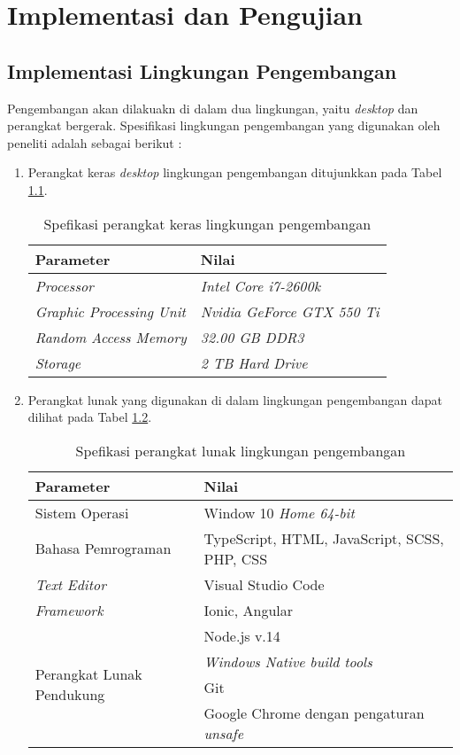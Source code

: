 \chapter{Implementasi dan Pengujian}

\section{Implementasi Lingkungan Pengembangan}
Pengembangan akan dilakuakn di dalam dua lingkungan, yaitu \textit{desktop} dan perangkat bergerak. Spesifikasi lingkungan pengembangan yang digunakan oleh peneliti adalah sebagai berikut :

\begin{enumerate}
\item Perangkat keras \textit{desktop} lingkungan pengembangan ditujunkkan pada Tabel \ref{spec:hardware:desktop}. 

\begin{table}[ht]
\caption{Spefikasi perangkat keras lingkungan pengembangan}
\centering
\begin{tabular}{|l | l |}
\hline
\textbf{Parameter} & \textbf{Nilai} \\  \hline
\textit{Processor}  &  \textit{Intel Core i7-2600k } \\ \hline
\textit{Graphic Processing Unit} & \textit{Nvidia GeForce GTX 550 Ti} \\ \hline
\textit{Random Access Memory}&  \textit{32.00 GB DDR3} \\ \hline
\textit{Storage} & \textit{2 TB Hard Drive} \\ 
\hline
\end{tabular}
\label{spec:hardware:desktop}
\end{table}

\item Perangkat lunak yang digunakan di dalam lingkungan pengembangan dapat dilihat pada Tabel \ref{spec:software}.

\begin{table}[ht]
\caption{Spefikasi perangkat lunak lingkungan pengembangan}
\centering
\begin{tabular}{|l | l |}
\hline
\textbf{Parameter} & \textbf{Nilai} \\ \hline
Sistem Operasi  &  Window 10 \textit{Home 64-bit} \\ \hline
Bahasa Pemrograman & TypeScript, HTML, JavaScript, SCSS, PHP, CSS \\ \hline
\textit{Text Editor} &  Visual Studio Code \\ \hline
\textit{Framework} & Ionic, Angular \\ \hline
\multirow{4}{*}{Perangkat Lunak Pendukung} &  Node.js v.14 \\ & \textit{Windows Native build tools}\\ &  Git \\ & Google Chrome dengan pengaturan \textit{unsafe} \\ 
\hline
\end{tabular}
\label{spec:software}
\end{table}


\end{enumerate}
